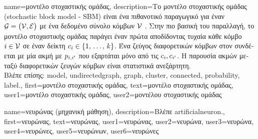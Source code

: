 {name={\foreignlanguage{greek}{μοντέλο στοχαστικής ομάδας}},
	description={\foreignlanguage{greek}{Το μοντέλο στοχαστικής ομάδας}
		(sto\-chastic block model - SBM) \cite{holland1983stochastic} \foreignlanguage{greek}{είναι ένα πιθανοτικό παραγωγικό}  
		\foreignlanguage{greek}{για έναν}  $\mathcal{G} = \big( \mathcal{V}, \mathcal{E} \big)$ 
		\foreignlanguage{greek}{με ένα δεδομένο σύνολο κόμβων} $\mathcal{V}$ \cite{AbbeSBM2018}. \foreignlanguage{greek}{Στην πιο 
		βασική του παραλλαγή, το μοντέλο στοχαστικής ομάδας παράγει έναν}  
		\foreignlanguage{greek}{πρώτα αποδίδοντας τυχαία κάθε κόμβο $i \in \mathcal{V}$ σε έναν δείκτη} 
		 $c_{i} \in \{1, \,\ldots, \,k\}$. \foreignlanguage{greek}{Ένα ζεύγος διαφορετικών 
		κόμβων στον}  \foreignlanguage{greek}{συνδέεται με μία ακμή με}  $p_{i,i'}$ 
		\foreignlanguage{greek}{που εξαρτάται μόνο από τις}  $c_{i}, c_{i'}$. 
		\foreignlanguage{greek}{Η παρουσία ακμών μεταξύ διαφορετικών ζευγών κόμβων είναι στατιστικά ανεξάρτητη.} 
		\\
		\foreignlanguage{greek}{Βλέπε επίσης:} \gls{model}, \gls{undirectedgraph}, \gls{graph}, \gls{cluster}, \gls{connected}, \gls{probability}, \gls{label}.},
	first={\foreignlanguage{greek}{μοντέλο στοχαστικής ομάδας}},
	text={\foreignlanguage{greek}{μοντέλο στοχαστικής ομάδας}},
	user1={\foreignlanguage{greek}{μοντέλο στοχαστικής ομάδας}}, %
    	user2={\foreignlanguage{greek}{μοντέλου στοχαστικής ομάδας}} %
}

{name={\foreignlanguage{greek}{νευρώνας (μηχανική μάθηση)}},
	description={\foreignlanguage{greek}{Βλέπε} \gls{artificialneuron}.},
	first={\foreignlanguage{greek}{νευρώνας}},
	text={\foreignlanguage{greek}{νευρώνας}},
	user1={\foreignlanguage{greek}{νευρώνας}}, %
	user2={\foreignlanguage{greek}{νευρώνα}}, %
	user3={\foreignlanguage{greek}{νευρώνα}}, %
	user4={\foreignlanguage{greek}{νευρώνες}}, %
	user5={\foreignlanguage{greek}{νευρώνων}}, %
	user6={\foreignlanguage{greek}{νευρώνες}} %
}

